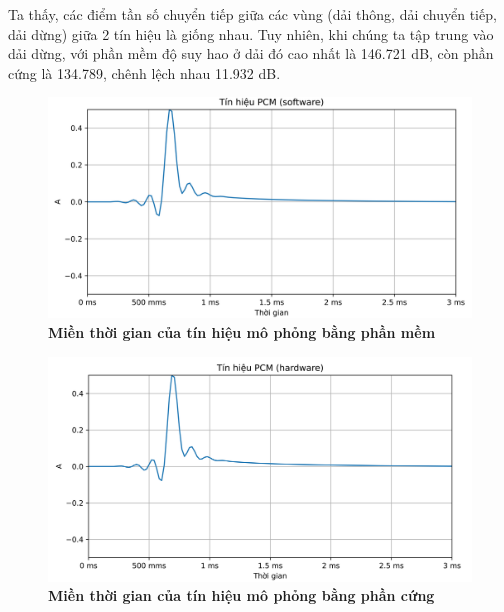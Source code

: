 Ta thấy, các điểm tần số chuyển tiếp giữa các vùng (dải thông, dải chuyển tiếp, dải dừng) giữa 2 tín hiệu là giống nhau. Tuy nhiên, khi chúng ta tập trung vào dải dừng, với phần mềm độ suy hao ở dải đó cao nhất là 146.721 dB, còn phần cứng là 134.789, chênh lệch nhau 11.932 dB. 

\begin{figure}[H]
    \centering
    \includegraphics[width=12cm]{Images/Chuong4/tb/sim/sin_1.png}
    \caption[Miền thời gian của tín hiệu mô phỏng bằng phần mềm]{\bfseries \fontsize{12pt}{0pt}\selectfont Miền thời gian của tín hiệu mô phỏng bằng phần mềm}
    \label{sin_1}
\end{figure}

\begin{figure}[H]
    \centering
    \includegraphics[width=12cm]{Images/Chuong4/tb/sim/sin_1_h.png}
    \caption[Miền thời gian của tín hiệu mô phỏng bằng phần cứng]{\bfseries \fontsize{12pt}{0pt}\selectfont Miền thời gian của tín hiệu mô phỏng bằng phần cứng}
    \label{sin_1_h}
\end{figure}

